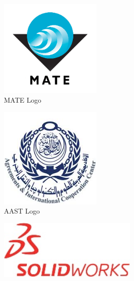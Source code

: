 \begin{figure}[h]
    \centering
    \begin{subfigure}[b]{0.2\textwidth}
        \centering
        \includegraphics[width=0.55\textwidth]{Sections/6Conclusion/images/MATE_logo.png}
        \caption{MATE Logo}
    \end{subfigure}
    \begin{subfigure}{0.2\textwidth}
        \centering
        \includegraphics[width=0.55\textwidth]{Sections/6Conclusion/images/AAST_logo.png}
        \caption{AAST Logo}
    \end{subfigure}
    \begin{subfigure}[b]{0.2\textwidth}
        \centering
        \includegraphics[width=0.75\textwidth]{Sections/6Conclusion/images/solidworks_logo.png}

\end{subfigure}
\end{figure}
